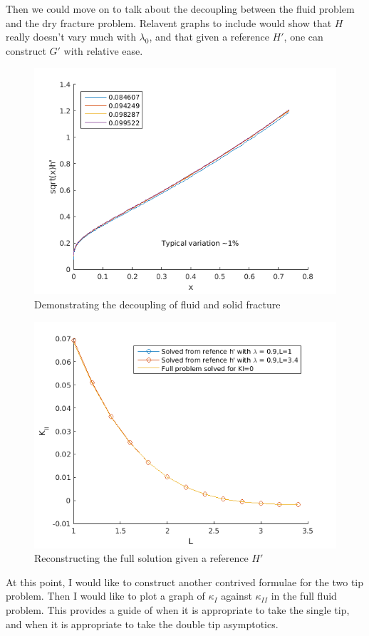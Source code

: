 \documentclass{jfm}
\begin{document}
Then we could move on to talk about the decoupling between the fluid problem
and the dry fracture problem. Relavent graphs to include would show that
$H$ really doesn't vary much with $\lambda_0$, and that given a reference
$H'$, one can construct $G'$ with relative ease.

\begin{figure}
 \centerline{
\includegraphics[scale=0.4]{./../../Graphs/hprime-variation.png}}
  \caption{Demonstrating the decoupling of fluid and solid fracture}
\end{figure}
%
\begin{figure}
 \centerline{
\includegraphics[scale=0.4]{./../../Graphs/fixed-fluid.png}}
  \caption{Reconstructing the full solution given a reference $H'$}
\end{figure}
At this point, I would like to construct another contrived formulae for the
two tip problem. Then I would like to plot a graph of $\kappa_I$ against
$\kappa_{II}$ in the full fluid problem. This provides a guide of when it
is appropriate to take the single tip, and when it is appropriate to take
the double tip asymptotics.
\end{document}
